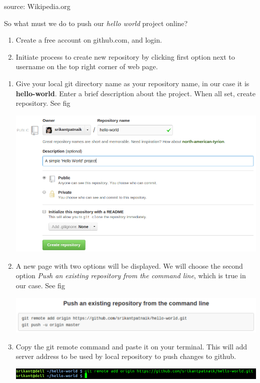 \documentclass[letterpaper,10pt,english]{sphinxmanual}
\begin{document}
source: Wikipedia.org

So what must we do to push our \emph{hello world} project online?
\begin{enumerate}
\item {} 
Create a free account on github.com, and login.

\item {} 
Initiate process to create new repository by clicking first option next to
username on the top right corner of web page.

\end{enumerate}
\begin{enumerate}
\item {} 
Give your local git directory name as your repository name, in our case it
is \textbf{hello-world}. Enter a brief description about the project. When all set,
create repository. See fig

\includegraphics[width=0.900\linewidth]{create-repo-name.png}

\item {} 
A new page with two options will be displayed. We will choose the second
option \emph{Push an existing repository from the command line}, which
is true in our case. See fig

\includegraphics[width=1.000\linewidth]{github-repo-instructions.png}

\item {} 
Copy the git remote command and paste it on your terminal. This will add
server address to be used by local repository to push changes to github.

\includegraphics[width=1.000\linewidth]{git-remote-add.png}


\end{enumerate}
\end{document}
